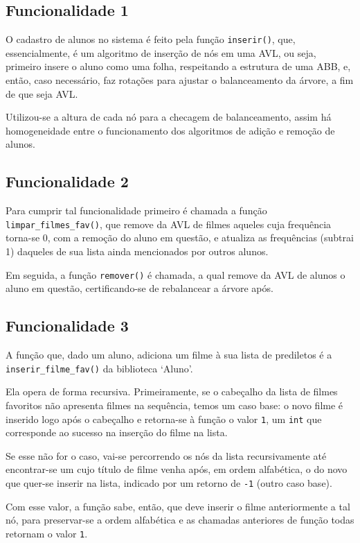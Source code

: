 \documentclass[12pt,a4paper,portuguese]{article}
\begin{document}
    \subsection*{Funcionalidade 1}
        O cadastro de alunos no sistema é feito pela função \verb|inserir()|, que, essencialmente, é um algoritmo de inserção de nós em uma AVL, ou seja, primeiro insere o aluno como uma folha, respeitando a estrutura de uma ABB, e, então, caso necessário, faz rotações para ajustar o balanceamento da árvore, a fim de que seja AVL.

        Utilizou-se a altura de cada nó para a checagem de balanceamento, assim há homogeneidade entre o funcionamento dos algoritmos de adição e remoção de alunos.
    \subsection*{Funcionalidade 2}
        Para cumprir tal funcionalidade primeiro é chamada a função \verb|limpar_filmes_fav()|, que remove da AVL de filmes aqueles cuja frequência torna-se 0, com a remoção do aluno em questão, e atualiza as frequências (subtrai 1) daqueles de sua lista ainda mencionados por outros alunos.

        Em seguida, a função \verb|remover()| é chamada, a qual remove da AVL de alunos o aluno em questão, certificando-se de rebalancear a árvore após.

    \subsection*{Funcionalidade 3}
        A função que, dado um aluno, adiciona um filme à sua lista de prediletos é a \verb|inserir_filme_fav()| da biblioteca `Aluno'.

        Ela opera de forma recursiva. Primeiramente, se o cabeçalho da lista de filmes favoritos não apresenta filmes na sequência, temos um caso base: o novo filme é inserido logo após o cabeçalho e retorna-se à função o valor \verb|1|, um \verb|int| que corresponde ao sucesso na inserção do filme na lista.
        
        Se esse não for o caso, vai-se percorrendo os nós da lista recursivamente até encontrar-se um cujo título de filme venha após, em ordem alfabética, o do novo que quer-se inserir na lista, indicado por um retorno de \verb|-1| (outro caso base).
        
        Com esse valor, a função sabe, então, que deve inserir o filme anteriormente a tal nó, para preservar-se a ordem alfabética e as chamadas anteriores de função todas retornam o valor \verb|1|.
\end{document}
